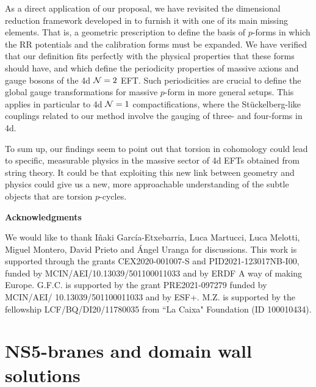\documentclass[11pt]{article}
\def\CN {{\cal N}}
\begin{document}
As a direct application of our proposal, we have revisited the dimensional reduction framework developed in \cite{Gurrieri:2002wz,DAuria:2004kwe,Grana:2005ny,Kashani-Poor:2006ofe} to furnish it with one of its main missing elements. That is, a geometric prescription to define the basis of $p$-forms in which the RR potentials and the calibration forms must be expanded. We have verified that our definition fits perfectly with the physical properties that these forms should have, and which define the periodicity properties of massive axions and gauge bosons of the 4d $\CN=2$ EFT. Such periodicities are crucial to define the global gauge transformations for massive $p$-form in more general setups. This applies in particular to  4d $\CN=1$ compactifications, where the St\"uckelberg-like couplings related to our method involve the gauging of three- and four-forms in 4d. 

To sum up, our findings seem to point out that torsion in cohomology could lead to specific, measurable physics in the massive sector of 4d EFTs obtained from string theory. It could be that exploiting this new link between geometry and physics could give us a new, more approachable understanding of the subtle objects that are torsion $p$-cycles. 




\bigskip


\centerline{\bf  Acknowledgments}

\vspace*{.5cm}

We would like to thank I\~naki Garc\'ia-Etxebarria, Luca Martucci, Luca Melotti, Miguel Montero, David Prieto and \'Angel Uranga for discussions.  This work is supported through the grants CEX2020-001007-S and PID2021-123017NB-I00, funded by MCIN/AEI/10.13039/501100011033 and by ERDF A way of making Europe. G.F.C. is supported by the grant PRE2021-097279 funded by MCIN/AEI/ 10.13039/501100011033 and by ESF+. M.Z. is supported by the fellowship LCF/BQ/DI20/11780035 from ``La Caixa" Foundation (ID 100010434).




\appendix


\section{NS5-branes and domain wall solutions}
\label{ap:NS5DW}
\end{document}

